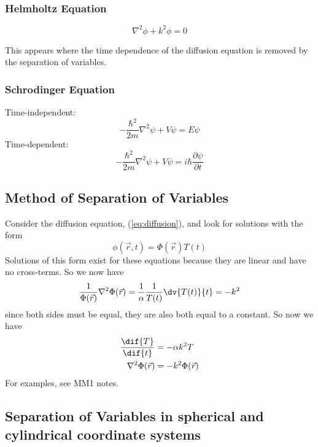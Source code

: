 \subsubsection{Helmholtz Equation}
\label{sec:helmholtzpde}

\begin{equation}
  \label{eq:helmholtz}
  \nabla^2 \phi + k^2 \phi = 0
\end{equation}

This appears where the time dependence of the diffusion equation is
removed by the separation of variables.

\subsubsection{Schrodinger Equation}
\label{sec:schrodingerpde}

Time-independent:
\begin{equation}
  \label{eq:tindyschrodinger}
  - \frac{\hbar^2}{2m} \nabla^2 \psi + V \psi = E \psi
\end{equation}
Time-dependent:
\begin{equation}
  \label{eq:tdschrodinger}
  - \frac{\hbar^2}{2m} \nabla^2 \psi + V \psi = i \hbar \frac{\partial \psi}{\partial t}
\end{equation}

\subsection{Method of Separation of Variables}
\label{sec:sepvar}

Consider the diffusion equation, (\ref{eq:diffusion}), and look for
solutions with the form \[ \phi(\vec{r}, t) = \Phi(\vec{r}) T(t) \]
Solutions of this form exist for these equations because they are
linear and have no cross-terms.  So we now have
\begin{equation*}
  \frac{1}{\Phi (\vec{r}) } \nabla^2 \Phi(\vec{r}) = \frac{1}{\alpha} \frac{1}{T(t)} \dv{T(t)}{t}  = -k^2
\end{equation*}
since both sides must be equal, they are also both equal to a
constant.  So now we have
\begin{align*}
  \frac{\dif{T}}{\dif{t}} &= -\alpha k^2 T \\
  \nabla^2 \Phi(\vec{r}) &= -k^2 \Phi(\vec{r})
\end{align*}
For examples, see MM1 notes.

\subsection{Separation of Variables in spherical and cylindrical
  coordinate systems}
\label{sec:sepvarcylsph}

